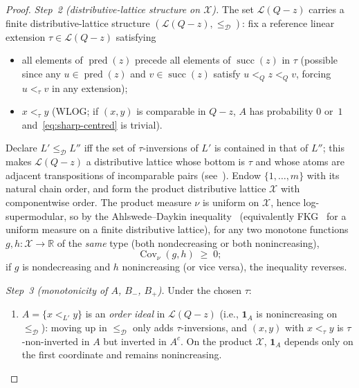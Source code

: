 \begin{proof}
\emph{Step~2 (distributive-lattice structure on $\mathcal X$).} The
set $\mathcal L(Q-z)$ carries a finite distributive-lattice structure
$(\mathcal L(Q-z), \le_{\mathcal D})$: fix a reference linear
extension $\tau \in \mathcal L(Q-z)$ satisfying
\begin{itemize}[nosep]
 \item all elements of $\operatorname{pred}(z)$ precede all elements of
 $\operatorname{succ}(z)$ in $\tau$ (possible since any
 $u \in \operatorname{pred}(z)$ and $v \in \operatorname{succ}(z)$ satisfy
 $u <_Q z <_Q v$, forcing $u <_\tau v$ in any extension);
 \item $x <_\tau y$ (WLOG; if $(x,y)$ is comparable in $Q-z$, $A$ has
 probability $0$ or~$1$ and~\eqref{eq:sharp-centred} is trivial).
\end{itemize}
Declare $L' \le_{\mathcal D} L''$ iff the set of
$\tau$-inversions of $L'$ is contained in that of $L''$; this makes
$\mathcal L(Q-z)$ a distributive lattice whose bottom is $\tau$ and
whose atoms are adjacent transpositions of incomparable pairs
(see~\cite[Prop.~3.5.1]{Brightwell1999}). Endow $\{1, \ldots, m\}$
with its natural chain order, and form the product distributive
lattice $\mathcal X$ with componentwise order. The product measure
$\nu$ is uniform on $\mathcal X$, hence log-supermodular, so by the
Ahlswede--Daykin inequality~\cite{AhlswedeDaykin1978} (equivalently
FKG~\cite{FKG1971} for a uniform measure on a finite distributive
lattice), for any two monotone functions
$g, h : \mathcal X \to \mathbb R$ of the \emph{same} type (both
nondecreasing or both nonincreasing),
\begin{equation}\label{eq:FKG-lattice}
  \operatorname{Cov}_\nu(g, h) \;\ge\; 0;
\end{equation}
if $g$ is nondecreasing and $h$ nonincreasing (or vice versa), the
inequality reverses.

\emph{Step~3 (monotonicity of $A$, $B_-$, $B_+$).} Under the chosen
$\tau$:
\begin{enumerate}[label=(\alph*),nosep]
 \item $A = \{x <_{L'} y\}$ is an \emph{order ideal} in $\mathcal L(Q-z)$
 (i.e., $\mathbf{1}_A$ is nonincreasing on $\le_{\mathcal D}$): moving
 up in $\le_{\mathcal D}$ only adds $\tau$-inversions, and $(x,y)$ with
 $x <_\tau y$ is $\tau$-non-inverted in $A$ but inverted in $A^c$. On
 the product $\mathcal X$, $\mathbf{1}_A$ depends only on the first
 coordinate and remains nonincreasing.


\end{enumerate}
\end{proof}
